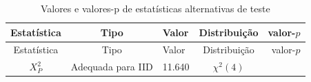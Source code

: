 \documentclass[]{book}
\theoremstyle{definition}
\theoremstyle{definition}
\theoremstyle{definition}
\theoremstyle{remark}
\begin{document}
\begin{longtable}[]{@{}cclcr@{}}
\caption{\label{tab:estaltteste}Valores e valores-p de estatísticas
alternativas de teste}\tabularnewline
\toprule
\begin{minipage}[b]{0.40\columnwidth}\centering\strut
Estatística\strut
\end{minipage} & \begin{minipage}[b]{0.15\columnwidth}\centering\strut
Tipo\strut
\end{minipage} & \begin{minipage}[b]{0.05\columnwidth}\raggedright\strut
Valor\strut
\end{minipage} & \begin{minipage}[b]{0.19\columnwidth}\centering\strut
Distribuição\strut
\end{minipage} & \begin{minipage}[b]{0.07\columnwidth}\raggedleft\strut
valor-\(p\)\strut
\end{minipage}\tabularnewline
\midrule
\endfirsthead
\toprule
\begin{minipage}[b]{0.40\columnwidth}\centering\strut
Estatística\strut
\end{minipage} & \begin{minipage}[b]{0.15\columnwidth}\centering\strut
Tipo\strut
\end{minipage} & \begin{minipage}[b]{0.05\columnwidth}\raggedright\strut
Valor\strut
\end{minipage} & \begin{minipage}[b]{0.19\columnwidth}\centering\strut
Distribuição\strut
\end{minipage} & \begin{minipage}[b]{0.07\columnwidth}\raggedleft\strut
valor-\(p\)\strut
\end{minipage}\tabularnewline
\midrule
\endhead
\begin{minipage}[t]{0.40\columnwidth}\centering\strut
\(X_{P}^{2}\)\strut
\end{minipage} & \begin{minipage}[t]{0.15\columnwidth}\centering\strut
Adequada para IID\strut
\end{minipage} & \begin{minipage}[t]{0.05\columnwidth}\raggedright\strut
11.640\strut
\end{minipage} & \begin{minipage}[t]{0.19\columnwidth}\centering\strut
\(\chi ^{2}(4)\)\strut
\end{minipage} & \begin{minipage}[t]{0.07\columnwidth}\raggedleft\strut

\end{minipage}
\end{longtable}
\end{document}
